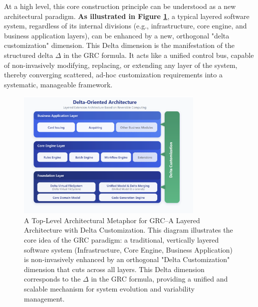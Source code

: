 \documentclass[11pt]{article}
\begin{document}
At a high level, this core construction principle can be understood as a new architectural paradigm. \textbf{As illustrated in Figure \ref{fig:delta_arch}}, a typical layered software system, regardless of its internal divisions (e.g., infrastructure, core engine, and business application layers), can be enhanced by a new, orthogonal "delta customization" dimension. This Delta dimension is the manifestation of the structured delta $\Delta$ in the GRC formula. It acts like a unified control bus, capable of non-invasively modifying, replacing, or extending any layer of the system, thereby converging scattered, ad-hoc customization requirements into a systematic, manageable framework.

\begin{figure}[htbp]
    \centering
    \includegraphics[width=0.8\textwidth]{ddd/delta-oriented-arch.png}
    \caption{A Top-Level Architectural Metaphor for GRC--A Layered Architecture with Delta Customization. This diagram illustrates the core idea of the GRC paradigm: a traditional, vertically layered software system (Infrastructure, Core Engine, Business Application) is non-invasively enhanced by an orthogonal "Delta Customization" dimension that cuts across all layers. This Delta dimension corresponds to the $\Delta$ in the GRC formula, providing a unified and scalable mechanism for system evolution and variability management.}
    \label{fig:delta_arch}
\end{figure}
\end{document}
